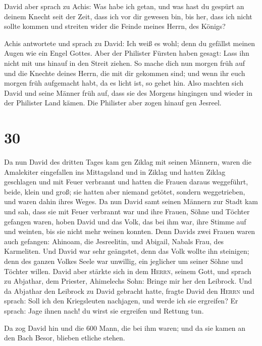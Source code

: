 David aber sprach zu Achis: Was habe ich getan, und was
hast du gespürt an deinem Knecht seit der Zeit, dass ich vor dir gewesen
bin, bis her, dass ich nicht sollte kommen und streiten wider die Feinde
meines Herrn, des Königs?

 Achis antwortete und sprach zu David: Ich weiß es wohl;
denn du gefällst meinen Augen wie ein Engel Gottes. Aber der Philister
Fürsten haben gesagt: Lass ihn nicht mit uns hinauf in den Streit
ziehen.  So mache dich nun morgen früh auf und die
Knechte deines Herrn, die mit dir gekommen sind; und wenn ihr euch
morgen früh aufgemacht habt, da es licht ist, so gehet hin.
 Also machten sich David und seine Männer früh auf, dass
sie des Morgens hingingen und wieder in der Philister Land kämen. Die
Philister aber zogen hinauf gen Jesreel.

\hypertarget{section-29}{%
\section{30}\label{section-29}}

 Da nun David des dritten Tages kam gen Ziklag mit seinen
Männern, waren die Amalekiter eingefallen ins Mittagsland und in Ziklag
und hatten Ziklag geschlagen und mit Feuer verbrannt  und
hatten die Frauen daraus weggeführt, beide, klein und groß; sie hatten
aber niemand getötet, sondern weggetrieben, und waren dahin ihres Weges.
 Da nun David samt seinen Männern zur Stadt kam und sah,
dass sie mit Feuer verbrannt war und ihre Frauen, Söhne und Töchter
gefangen waren,  hoben David und das Volk, das bei ihm
war, ihre Stimme auf und weinten, bis sie nicht mehr weinen konnten.
 Denn Davids zwei Frauen waren auch gefangen: Ahinoam, die
Jesreelitin, und Abigail, Nabals Frau, des Karmeliten. 
Und David war sehr geängstet, denn das Volk wollte ihn steinigen; denn
des ganzen Volkes Seele war unwillig, ein jeglicher um seiner Söhne und
Töchter willen. David aber stärkte sich in dem \textsc{Herrn}, seinem
Gott,  und sprach zu Abjathar, dem Priester, Ahimelechs
Sohn: Bringe mir her den Leibrock. Und da Abjathar den Leibrock zu David
gebracht hatte,  fragte David den \textsc{Herrn} und
sprach: Soll ich den Kriegsleuten nachjagen, und werde ich sie
ergreifen? Er sprach: Jage ihnen nach! du wirst sie ergreifen und
Rettung tun.

 Da zog David hin und die 600 Mann, die bei ihm waren; und
da sie kamen an den Bach Besor, blieben etliche stehen.

